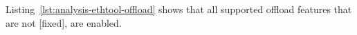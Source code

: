 Listing~\ref{lst:analysis-ethtool-offload} shows that all supported offload features that are not [fixed], are enabled.








